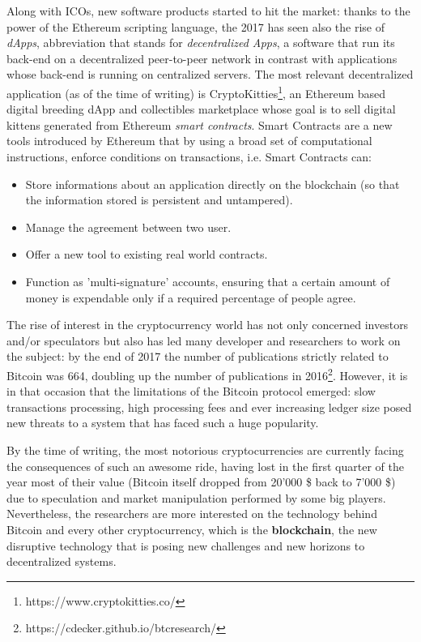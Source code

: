 		Along with ICOs, new software products started to hit the market: thanks to the power of the Ethereum \cite{Buterin2014} scripting language, the 2017 has seen also the rise of \textit{dApps}, abbreviation that stands for \textit{decentralized Apps}, a software that run its back-end  on a decentralized peer-to-peer network in contrast with applications whose back-end is running on centralized servers. The most relevant decentralized application (as of the time of writing) is CryptoKitties\footnote{https://www.cryptokitties.co/}, an Ethereum based digital breeding dApp and collectibles marketplace whose goal is to sell digital kittens generated from Ethereum \textit{smart contracts}. Smart Contracts are a new tools introduced by Ethereum that by using a broad set of computational instructions, enforce conditions on transactions, i.e. Smart Contracts can:
		\begin{itemize}
			\item Store informations about an application directly on the blockchain (so that the information stored is persistent and untampered).
			\item Manage the agreement between two user.
			\item Offer a new tool to existing real world contracts.
			\item Function as 'multi-signature' accounts, ensuring that a certain amount of money is expendable only if a required percentage of people agree.
		\end{itemize}
		The rise of interest in the cryptocurrency world has not only concerned investors and/or speculators but also has led many developer and researchers to work on the subject: by the end of 2017 the number of publications strictly related to Bitcoin was 664, doubling up the number of publications in 2016\footnote{https://cdecker.github.io/btcresearch/}. However, it is in that occasion that the limitations of the Bitcoin protocol emerged: slow transactions processing, high processing fees and ever increasing ledger size posed new threats to a system that has faced such a huge popularity.
		
		By the time of writing, the most notorious cryptocurrencies are currently facing the consequences of such an awesome ride, having lost in the first quarter of the year most of their value (Bitcoin itself dropped from 20'000 \$ back to 7'000 \$) due to speculation and market manipulation performed by some big players.  Nevertheless, the researchers are more interested on the technology behind Bitcoin and every other cryptocurrency, which is the \textbf{blockchain}, the new disruptive technology that is posing new challenges and new horizons to decentralized systems. 
		
